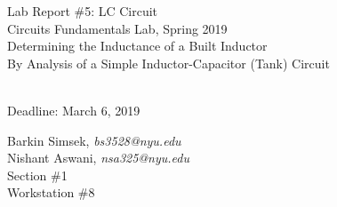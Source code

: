 \documentclass[journal]{IEEEtran}
\begin{document}
\begin{titlepage}
    {\centering
        \vspace*{20em}
        {
        \huge 
        \begin{spacing}{1.5}
            Lab Report \#5: LC Circuit
            \\
            Circuits Fundamentals Lab, Spring 2019
            \bigskip
            \Large
            \\
            Determining the Inductance of a Built Inductor\\
            By Analysis of a Simple Inductor-Capacitor (Tank) Circuit
  
            \\
            \bigskip
            Deadline: March 6, 2019 
        \end{spacing}

        }
        
    }
    \vfill
    
    {
    \large
    
    \begin{spacing}{1.5}
    \noindent Barkin Simsek, {\it {bs3528@nyu.edu}} 
    \\
    Nishant Aswani, {\it {nsa325@nyu.edu}}
    \\
    Section \#1%
    \\
    Workstation \#8%
    \end{spacing}
    }


\end{titlepage}
{}
\setcounter{page}{1}




%
{}


\begin{abstract}
In this experiment, an inductor was built by using copper wire and PVC pipe. The inductor was used to implement a simple LC circuit, through which AC signals were passed at varying frequencies and the output was measured using an oscilloscope, thus allowing for the calculation of the resonant frequency and inductance. Calculations showed that the resonant frequency for the built inductor was 14400 Hz; therefore, the calculated inductance was 0.083 mH. This was compared to the measured inductance of 0.081 mH, thus verifying the experimental procedure as a valid method for determining an unknown inductance.
\end{abstract}
\end{document}

